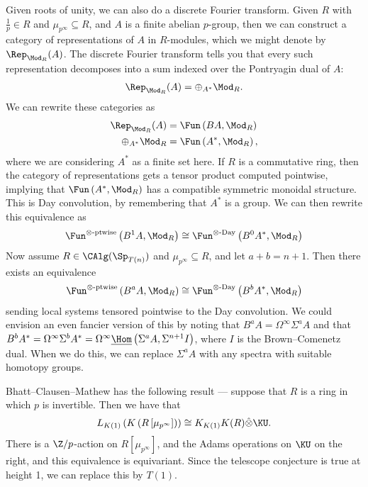 Given roots of unity, we can also do a discrete Fourier transform. Given $R$ with $\frac{1}{p}\in R$ and $\mu_{p^\infty} \subseteq R$, and $A$ is a finite abelian $p$-group, then we can construct a category of representations of $A$ in $R$-modules, which we might denote by $\Rep_{\Mod_R}(A)$. The discrete Fourier transform tells you that every such representation decomposes into a sum indexed over the Pontryagin dual of $A$:
\begin{align*}
    \Rep_{\Mod_R}(A) = \oplus_{A^\ast} \Mod_R.
\end{align*}
We can rewrite these categories as
\begin{align*}
    \Rep_{\Mod_R}(A) &= \Fun \left( BA, \Mod_R \right) \\
    \oplus_{A^\ast} \Mod_R &= \Fun \left( A^\ast, \Mod_R \right),
\end{align*}
where we are considering $A^\ast$ as a finite set here. If $R$ is a commutative ring, then the category of representations gets a tensor product computed pointwise, implying that $\Fun \left( A^\ast, \Mod_R \right)$ has a compatible symmetric monoidal structure. This is Day convolution, by remembering that $A^\ast$ is a group. We can then rewrite this equivalence as
\begin{align*}
    \Fun^{\otimes\text{-ptwise}} \left( B^1A, \Mod_R \right) \cong \Fun^{\otimes\text{-Day}} \left( B^0A^\ast, \Mod_R \right)
\end{align*}
Now assume $R \in \CAlg(\Sp_{T(n)})$ and $\mu_{p^\infty} \subseteq R$, and let $a+b = n+1$. Then there exists an equivalence
\begin{align*}
    \Fun^{\otimes\text{-ptwise}} \left( B^a A, \Mod_R \right) \cong \Fun^{\otimes\text{-Day}} \left( B^b A^\ast, \Mod_R \right)
\end{align*}
sending local systems tensored pointwise to the Day convolution. We could envision an even fancier version of this by noting that $B^a A = \Omega^\infty \Sigma^a A$ and that $B^b A^\ast = \Omega^\infty \Sigma^b A^\ast = \Omega^\infty \underline{\Hom}\left( \Sigma^a A, \Sigma^{n+1} I \right)$, where $I$ is the Brown--Comenetz dual. When we do this, we can replace $\Sigma^a A$ with any spectra with suitable homotopy groups.

Bhatt--Clausen--Mathew has the following result --- suppose that $R$ is a ring in which $p$ is invertible. Then we have that
\begin{align*}
    L_{K(1)} \left( K \left( R \left[ \mu_{p^\infty} \right] \right) \right) \cong K_{K(1)} K(R) \hat{\otimes} \KU.
\end{align*}
There is a $\Z/p$-action on $R \left[ \mu_{p^\infty} \right]$, and the Adams operations on $\KU$ on the right, and this equivalence is equivariant. Since the telescope conjecture is true at height 1, we can replace this by $T(1)$.

